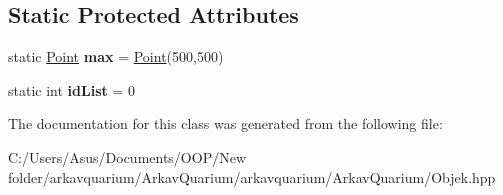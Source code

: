\subsection*{Static Protected Attributes}
\begin{DoxyCompactItemize}
\item 
\mbox{\label{class_objek_aeda3bebcf4abfba4d5ff64a03c16dbc6}} 
static \mbox{\hyperlink{class_point}{Point}} {\bfseries max} = \mbox{\hyperlink{class_point}{Point}}(500,500)
\item 
\mbox{\label{class_objek_aa3eeea111826d0cc0635c7a95d1b6e43}} 
static int {\bfseries id\+List} = 0
\end{DoxyCompactItemize}


The documentation for this class was generated from the following file\+:\begin{DoxyCompactItemize}
\item 
C\+:/\+Users/\+Asus/\+Documents/\+O\+O\+P/\+New folder/arkavquarium/\+Arkav\+Quarium/arkavquarium/\+Arkav\+Quarium/Objek.\+hpp\end{DoxyCompactItemize}
